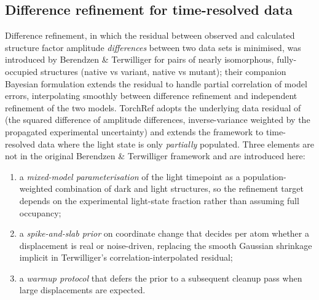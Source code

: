 \documentclass{iucrjournals}
\begin{document}
\subsection{Difference refinement for time-resolved data}\label{sec:diff-refine}

Difference refinement, in which the residual between observed and
calculated structure factor amplitude \emph{differences} between two
data sets is minimised, was introduced by Berendzen \& Terwilliger
\cite{berendzen_difference_1995} for pairs of nearly isomorphous,
fully-occupied structures (native vs variant, native vs mutant);
their companion Bayesian formulation \cite{terwilliger_bayesian_1996}
extends the residual to handle partial correlation of model errors,
interpolating smoothly between difference refinement and independent
refinement of the two models.  TorchRef adopts the underlying data
residual of \cite{berendzen_difference_1995} (the squared difference
of amplitude differences, inverse-variance weighted by the propagated
experimental uncertainty) and extends the framework to time-resolved
data where the light state is only \emph{partially} populated.  Three
elements are not in the original Berendzen \& Terwilliger framework and
are introduced here:
%
\begin{enumerate}
\item a \emph{mixed-model parameterisation} of the light timepoint as a
  population-weighted combination of dark and light structures, so the
  refinement target depends on the experimental light-state fraction
  rather than assuming full occupancy;
\item a \emph{spike-and-slab prior} on coordinate change
  \cite{mitchell_beauchamp_1988} that decides per atom whether a
  displacement is real or noise-driven, replacing the smooth Gaussian
  shrinkage implicit in Terwilliger's correlation-interpolated residual;
\item a \emph{warmup protocol} that defers the prior to a subsequent
  cleanup pass when large displacements are expected.
\end{enumerate}
\end{document}
